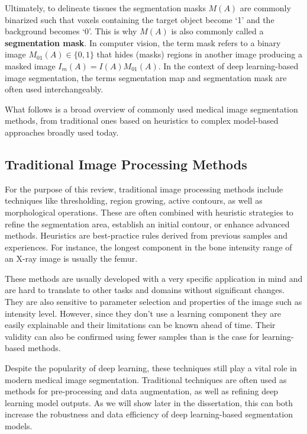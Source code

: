 Ultimately, to delineate tissues the segmentation masks $M(A)$ are commonly binarized such that voxels containing the target object become `1' and the background becomes `0'. This is why $M(A)$ is also commonly called a \textbf{segmentation mask}. In computer vision, the term mask refers to a binary image $M_{01}(A) \in \{0, 1\}$ that hides (masks) regions in another image producing a masked image $I_m(A) = I(A) M_{01}(A)$. In the context of deep learning-based image segmentation, the terms segmentation map and segmentation mask are often used interchangeably.

What follows is a broad overview of commonly used medical image segmentation methods, from traditional ones based on heuristics to complex model-based approaches broadly used today.

\subsection{Traditional Image Processing Methods}

For the purpose of this review, traditional image processing methods include techniques like thresholding, region growing, active contours, as well as morphological operations. These are often combined with heuristic strategies to refine the segmentation area, establish an initial contour, or enhance advanced methods. Heuristics are best-practice rules derived from previous samples and experiences. For instance, the longest component in the bone intensity range of an X-ray image is usually the femur.

These methods are usually developed with a very specific application in mind and are hard to translate to other tasks and domains without significant changes. They are also sensitive to parameter selection and properties of the image such as intensity level. However, since they don't use a learning component they are easily explainable and their limitations can be known ahead of time. Their validity can also be confirmed using fewer samples than is the case for learning-based methods.

Despite the popularity of deep learning, these techniques still play a vital role in modern medical image segmentation. Traditional techniques are often used as methods for pre-processing and data augmentation, as well as refining deep learning model outputs. As we will show later in the dissertation, this can both increase the robustness and data efficiency of deep learning-based segmentation models.

